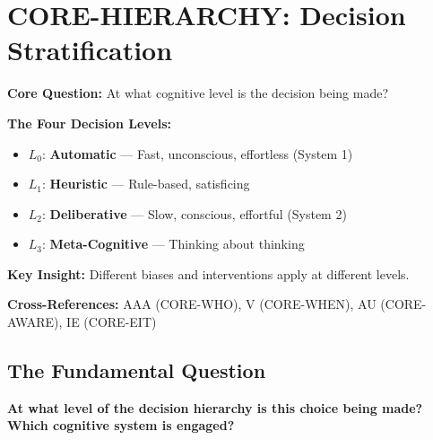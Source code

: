 \chapter{CORE-HIERARCHY: Decision Stratification}
\label{app:core-hierarchy}

\begin{abstract}
This appendix answers the ninth fundamental question:
\textit{``At what level of the decision hierarchy does this choice occur?''}
We formalize four decision levels: $L_0$ (Automatic/System 1), $L_1$ (Heuristic),
$L_2$ (Deliberative/System 2), and $L_3$ (Meta-Cognitive). The level determines
which behavioral biases apply and which intervention types are effective.
This is distinct from the welfare hierarchy (CORE-WHO), which concerns who has utility.
\end{abstract}

\begin{tcolorbox}[colback=blue!5!white, colframe=blue!75!black,
    title=Quick Reference: CORE-HIERARCHY]

\textbf{Core Question:} At what cognitive level is the decision being made?

\textbf{The Four Decision Levels:}
\begin{itemize}[nosep]
\item $L_0$: \textbf{Automatic} --- Fast, unconscious, effortless (System 1)
\item $L_1$: \textbf{Heuristic} --- Rule-based, satisficing
\item $L_2$: \textbf{Deliberative} --- Slow, conscious, effortful (System 2)
\item $L_3$: \textbf{Meta-Cognitive} --- Thinking about thinking
\end{itemize}

\textbf{Key Insight:}
Different biases and interventions apply at different levels.

\textbf{Cross-References:}
AAA (CORE-WHO), V (CORE-WHEN), AU (CORE-AWARE), IE (CORE-EIT)

\end{tcolorbox}

\section{The Fundamental Question}
\label{sec:hier-fundamental}

\begin{tcolorbox}[colback=red!5!white, colframe=red!75!black,
    title=The Fundamental Question]
\textbf{At what level of the decision hierarchy is this choice being made?
Which cognitive system is engaged?}
\end{tcolorbox}

